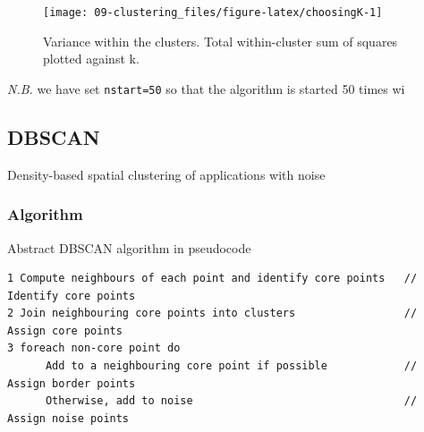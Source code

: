 \documentclass[]{book}
\newenvironment{Shaded}{\begin{snugshade}}{\end{snugshade}}
\newcommand{\KeywordTok}[1]{\textcolor[rgb]{0.13,0.29,0.53}{\textbf{{#1}}}}
\newcommand{\DataTypeTok}[1]{\textcolor[rgb]{0.13,0.29,0.53}{{#1}}}
\newcommand{\StringTok}[1]{\textcolor[rgb]{0.31,0.60,0.02}{{#1}}}
\newcommand{\NormalTok}[1]{{#1}}
\theoremstyle{definition}
\theoremstyle{definition}
\theoremstyle{definition}
\theoremstyle{remark}
\begin{document}
\begin{Shaded}
\end{Shaded}

\begin{figure}

{\centering \texttt{[image: 09-clustering\_files/figure-latex/choosingK-1]} 

}

\caption{Variance within the clusters. Total within-cluster sum of squares plotted against k.}\label{fig:choosingK}
\end{figure}

\emph{N.B.} we have set \texttt{nstart=50} so that the algorithm is
started 50 times wi

\subsection{DBSCAN}\label{dbscan}

Density-based spatial clustering of applications with noise

\subsubsection{Algorithm}\label{algorithm-1}

Abstract DBSCAN algorithm in pseudocode \citep{Schubert2017}

\begin{verbatim}
1 Compute neighbours of each point and identify core points   // Identify core points
2 Join neighbouring core points into clusters                 // Assign core points
3 foreach non-core point do
      Add to a neighbouring core point if possible            // Assign border points
      Otherwise, add to noise                                 // Assign noise points
\end{verbatim}
\end{document}
